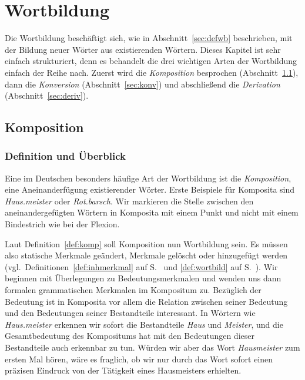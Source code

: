 \chapter{Wortbildung}

\label{sec:wortbildung}

Die Wortbildung beschäftigt sich, wie in Abschnitt~\ref{sec:defwb} beschrieben, mit der Bildung neuer Wörter aus existierenden Wörtern.
Dieses Kapitel ist sehr einfach strukturiert, denn es behandelt die drei wichtigen Arten der Wortbildung einfach der Reihe nach.
Zuerst wird die \textit{Komposition} besprochen (Abschnitt~\ref{sec:komp}), dann die \textit{Konversion} (Abschnitt~\ref{sec:konv}) und abschließend die \textit{Derivation} (Abschnitt~\ref{sec:deriv}).
 
\section{Komposition}

\label{sec:komp}

\subsection{Definition und Überblick}

Eine im Deutschen besonders häufige Art der Wortbildung ist die \textit{Komposition}, eine Aneinanderfügung existierender Wörter.
Erste Beispiele für Komposita sind \textit{Haus.meister} oder \textit{Rot.barsch}.
Wir markieren die Stelle zwischen den aneinandergefügten Wörtern in Komposita mit einem Punkt und nicht mit einem Bindestrich wie bei der Flexion.


Laut Definition~\ref{def:komp} soll Komposition nun Wortbildung sein.
Es müssen also statische Merkmale geändert, Merkmale gelöscht oder hinzugefügt werden (vgl.\ Definitionen~\ref{def:inhmerkmal} auf S.~\pageref{def:inhmerkmal} und \ref{def:wortbild} auf S.~\pageref{def:wortbild}).
Wir beginnen mit Überlegungen zu Bedeutungsmerkmalen und wenden uns dann formalen grammatischen Merkmalen im Kompositum zu.
Bezüglich der Bedeutung ist in Komposita vor allem die Relation zwischen seiner Bedeutung und den Bedeutungen seiner Bestandteile interessant.
In Wörtern wie \textit{Haus.meister} erkennen wir sofort die Bestandteile \textit{Haus} und \textit{Meister}, und die Gesamtbedeutung des Kompositums hat mit den Bedeutungen dieser Bestandteile auch erkennbar zu tun.
Würden wir aber das Wort \textit{Hausmeister} zum ersten Mal hören, wäre es fraglich, ob wir nur durch das Wort sofort einen präzisen Eindruck von der Tätigkeit eines Hausmeisters erhielten.

